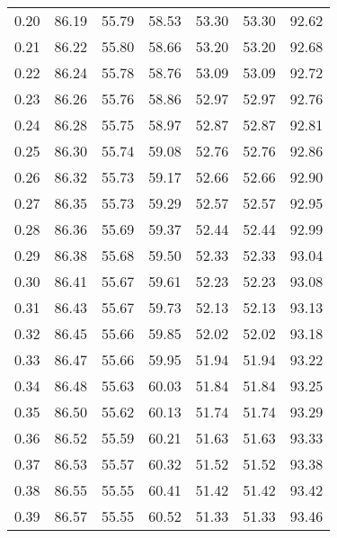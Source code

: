 \begin{tabular}{|c|c|c|c|c|c|c|}
      0.20 &     86.19 &     55.79 &      58.53 &   53.30 &      53.30 &         92.62 \\
      0.21 &     86.22 &     55.80 &      58.66 &   53.20 &      53.20 &         92.68 \\
      0.22 &     86.24 &     55.78 &      58.76 &   53.09 &      53.09 &         92.72 \\
      0.23 &     86.26 &     55.76 &      58.86 &   52.97 &      52.97 &         92.76 \\
      0.24 &     86.28 &     55.75 &      58.97 &   52.87 &      52.87 &         92.81 \\
      0.25 &     86.30 &     55.74 &      59.08 &   52.76 &      52.76 &         92.86 \\
      0.26 &     86.32 &     55.73 &      59.17 &   52.66 &      52.66 &         92.90 \\
      0.27 &     86.35 &     55.73 &      59.29 &   52.57 &      52.57 &         92.95 \\
      0.28 &     86.36 &     55.69 &      59.37 &   52.44 &      52.44 &         92.99 \\
      0.29 &     86.38 &     55.68 &      59.50 &   52.33 &      52.33 &         93.04 \\
      0.30 &     86.41 &     55.67 &      59.61 &   52.23 &      52.23 &         93.08 \\
      0.31 &     86.43 &     55.67 &      59.73 &   52.13 &      52.13 &         93.13 \\
      0.32 &     86.45 &     55.66 &      59.85 &   52.02 &      52.02 &         93.18 \\
      0.33 &     86.47 &     55.66 &      59.95 &   51.94 &      51.94 &         93.22 \\
      0.34 &     86.48 &     55.63 &      60.03 &   51.84 &      51.84 &         93.25 \\
      0.35 &     86.50 &     55.62 &      60.13 &   51.74 &      51.74 &         93.29 \\
      0.36 &     86.52 &     55.59 &      60.21 &   51.63 &      51.63 &         93.33 \\
      0.37 &     86.53 &     55.57 &      60.32 &   51.52 &      51.52 &         93.38 \\
      0.38 &     86.55 &     55.55 &      60.41 &   51.42 &      51.42 &         93.42 \\
      0.39 &     86.57 &     55.55 &      60.52 &   51.33 &      51.33 &         93.46 \\

\end{tabular}

